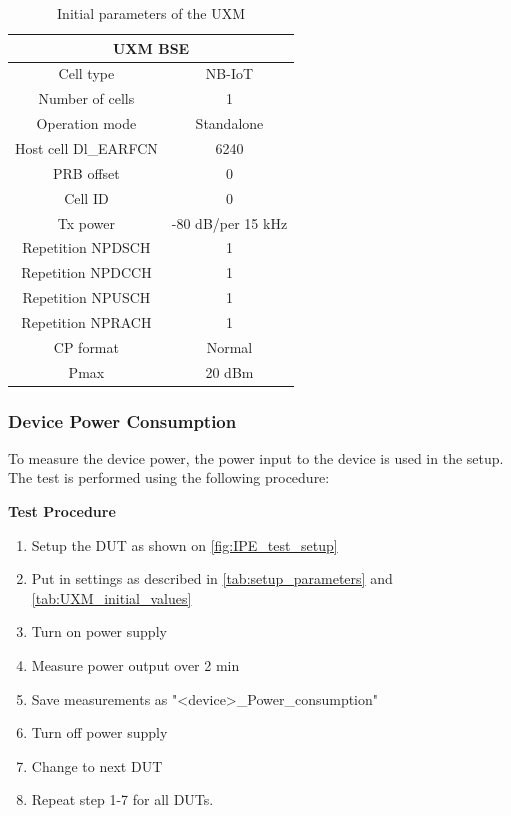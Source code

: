 \begin{table}[H]
\centering
\begin{tabular}{|c|c|} \hline
\multicolumn{2}{|c|}{\textbf{UXM \gls{BSE}}} \\ \hline
Cell type			 & NB-IoT         \\ \hline
Number of cells		 & 1              \\ \hline
Operation mode		 & Standalone     \\ \hline
Host cell Dl\_EARFCN & 6240           \\ \hline
PRB offset			 & 0	          \\ \hline
Cell ID				 & 0              \\ \hline
Tx power			 & -80 dB/per 15 kHz \\ \hline
Repetition NPDSCH	 & 1	          \\ \hline
Repetition NPDCCH	 & 1	          \\ \hline
Repetition NPUSCH	 & 1	          \\ \hline
Repetition NPRACH	 & 1	          \\ \hline
CP format			 & Normal         \\ \hline
Pmax				 & 20 dBm         \\ \hline
\end{tabular}
\caption{Initial parameters of the UXM}
\label{tab:UXM_initial_values}
\end{table}

\subsubsection{Device Power Consumption}

To measure the device power, the power input to the device is used in the setup. The test is performed using the following procedure:

\textbf{Test Procedure}
\vspace{-1.5em}
\begin{enumerate}
\item Setup the \gls{DUT} as shown on \autoref{fig:IPE_test_setup}
\item Put in settings as described in \autoref{tab:setup_parameters} and \autoref{tab:UXM_initial_values} 
\item Turn on power supply 
\item Measure power output over 2 min
\item Save measurements as "<device>\_Power\_consumption"
\item Turn off power supply
\item Change to next \gls{DUT}
\item Repeat step 1-7 for all \gls{DUT}s.
\end{enumerate}

